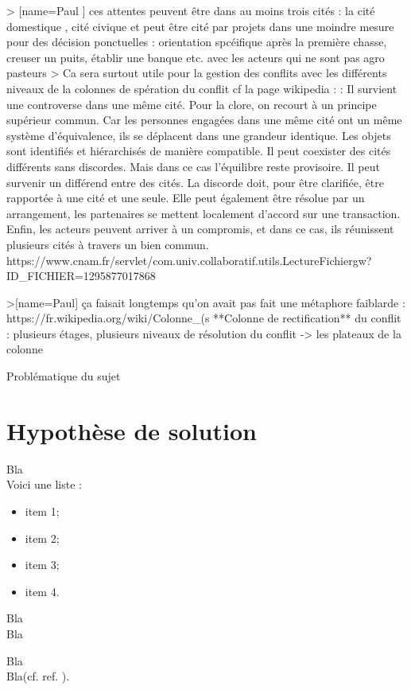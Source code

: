 > [name=Paul ] ces attentes peuvent être dans au moins trois cités : la cité domestique , cité civique et peut être cité par projets dans une moindre mesure pour des décision ponctuelles : orientation spcéifique après la première chasse, creuser un puits, établir une banque etc. avec les acteurs qui ne sont pas agro pasteurs 
> Ca sera surtout utile pour la gestion des conflits avec les différents niveaux de la colonnes de spération du conflit  cf la page wikipedia : :     Il survient une controverse dans une même cité. Pour la clore, on recourt à un principe supérieur commun. Car les personnes engagées dans une même cité ont un même système d'équivalence, ils se déplacent dans une grandeur identique. Les objets sont identifiés et hiérarchisés de manière compatible.
    Il peut coexister des cités différents sans discordes. Mais dans ce cas l'équilibre reste provisoire.
    Il peut survenir un différend entre des cités. La discorde doit, pour être clarifiée, être rapportée à une cité et une seule. Elle peut également être résolue par un arrangement, les partenaires se mettent localement d'accord sur une transaction. Enfin, les acteurs peuvent arriver à un compromis, et dans ce cas, ils réunissent plusieurs cités à travers un bien commun.
    https://www.cnam.fr/servlet/com.univ.collaboratif.utils.LectureFichiergw?ID_FICHIER=1295877017868


>[name=Paul] ça faisait longtemps qu'on avait pas fait une métaphore faiblarde : https://fr.wikipedia.org/wiki/Colonne_(s%
**Colonne de rectification** du conflit : plusieurs étages, plusieurs niveaux de résolution du conflit -> les plateaux de la colonne


\begin{center}
Problématique du sujet
\end{center}

\section{Hypothèse de solution}

Bla\\

Voici une liste :
\begin{itemize}
\item item 1;
\item item 2;
\item item 3;
\item item 4.
\end{itemize}

Bla\\

Bla

Bla\footnotemark\\

Bla(cf. ref. \cite{cite6}).

